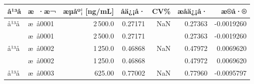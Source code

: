 \documentclass[UTF8,10pt,a4paper,fontset=fandol]{ctexart}
\newcommand{\fieldvalue}[1]{#1}
\begin{document}
\small
\begin{tabularx}{\textwidth}{l l r r r r r}
\textbf{å¹³å} & \textbf{æ ·æ¬} & \textbf{æµåº¦ [ng/mL]} &
\textbf{åä¿¡å·} & \textbf{CV\%} & \textbf{æåä¿¡å·} & \textbf{æ®å·®}\\
\hline
å¹³å &
\fieldvalue{æ å0001} &
\fieldvalue{2\,500.0} &
\fieldvalue{0.27171} &
\fieldvalue{NaN} &
\fieldvalue{0.27363} &
\fieldvalue{-0.0019260}\\

&
\fieldvalue{æ å0001} &
\fieldvalue{2\,500.0} &
\fieldvalue{0.27171} &
&
\fieldvalue{0.27363} &
\fieldvalue{-0.0019260}\\

å¹³å &
\fieldvalue{æ å0002} &
\fieldvalue{1\,250.0} &
\fieldvalue{0.46868} &
\fieldvalue{NaN} &
\fieldvalue{0.47972} &
\fieldvalue{0.0069620}\\

&
\fieldvalue{æ å0002} &
\fieldvalue{1\,250.0} &
\fieldvalue{0.46868} &
&
\fieldvalue{0.47972} &
\fieldvalue{0.0069620}\\

å¹³å &
\fieldvalue{æ å0003} &
\fieldvalue{625.00} &
\fieldvalue{0.77002} &
\fieldvalue{NaN} &
\fieldvalue{0.77960} &
\fieldvalue{-0.0095797}\\


\end{tabularx}
\end{document}
